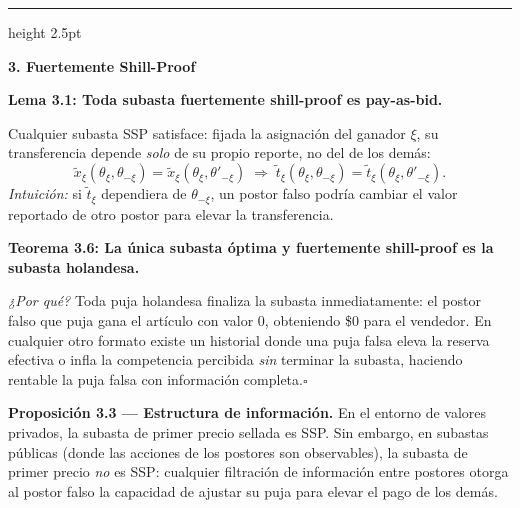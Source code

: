 \documentclass[20pt]{extarticle}
\renewcommand{\small}{\fontsize{20}{25}\selectfont}
\renewcommand{\footnotesize}{\fontsize{18}{22}\selectfont}
\newcommand{\redd}[1]{\textcolor{colred}{\textbf{#1}}}
\newcommand{\stit}[1]{{\fontsize{38}{46}\selectfont\color{ink}\textbf{#1}}}
\newcommand{\shr}{{\vspace{12mm}\color{rulegray}\hrule height 2.5pt\vspace{12mm}}}
\begin{document}
\begin{minipage}[t]{47cm}
  \shr

  \stit{3. Fuertemente Shill-Proof}

  \vspace{8mm}
  {\small\textbf{Lema 3.1: Toda subasta fuertemente shill-proof es pay-as-bid.}}
  \vspace{4mm}
  \begin{tcolorbox}[sidebar]
    \footnotesize Cualquier subasta SSP satisface: fijada la asignación del ganador $\xi$, su transferencia depende \emph{solo} de su propio reporte, no del de los demás:
    \[
      \tilde x_\xi(\theta_\xi,\theta_{-\xi}) = \tilde x_\xi(\theta_\xi,\theta'_{-\xi})
      \;\Longrightarrow\;
      \tilde t_\xi(\theta_\xi,\theta_{-\xi}) = \tilde t_\xi(\theta_\xi,\theta'_{-\xi}).
    \]
    \emph{Intuición:} si $\tilde t_\xi$ dependiera de $\theta_{-\xi}$, un postor falso podría cambiar el valor reportado de otro postor para elevar la transferencia.
  \end{tcolorbox}

  \vspace{8mm}
  {\small\textbf{Teorema 3.6: La única subasta óptima y fuertemente shill-proof es la \redd{subasta holandesa}.}}
  \vspace{4mm}
  \begin{tcolorbox}[rbar]
    \footnotesize
    \emph{¿Por qué?} Toda puja holandesa finaliza la subasta inmediatamente: el postor falso que puja gana el artículo con valor 0, obteniendo \$0 para el vendedor. En cualquier otro formato existe un historial donde una puja falsa eleva la reserva efectiva o infla la competencia percibida \emph{sin} terminar la subasta, haciendo rentable la puja falsa con información completa.\hfill$\square$
  \end{tcolorbox}

  \vspace{8mm}
  {\small\justifying\textbf{Proposición 3.3 — Estructura de información.}\enspace
    En el entorno de valores privados, la subasta de primer precio sellada es SSP. Sin embargo, en subastas públicas (donde las acciones de los postores son observables), la subasta de primer precio \emph{no} es SSP: cualquier filtración de información entre postores otorga al postor falso la capacidad de ajustar su puja para elevar el pago de los demás.}

\end{minipage}%
\hspace{2cm}%
\end{document}
